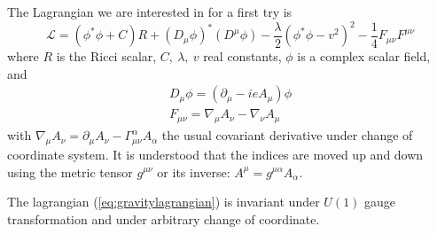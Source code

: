 The Lagrangian we are interested in for a first try is
\begin{equation}
  \mathcal{L} = \left(\phi^*\phi+C\right)R+(D_\mu\phi)^*(D^\mu\phi)-\frac{\lambda}{2}(\phi^*\phi-v^2)^2 -\frac{1}{4}F_{\mu\nu}F^{\mu\nu}\label{eq:gravitylagrangian}
\end{equation}
where $R$ is the Ricci scalar, $C,\ \lambda,\ v$ real constants, $\phi$ is a
complex scalar field, and
\begin{align}
  D_\mu\phi = (\partial_\mu-ieA_\mu)\phi\\
  F_{\mu\nu} = \nabla_\mu A_\nu-\nabla_\nu A_\mu
\end{align}
with $\nabla_\mu A_\nu = \partial_\mu A_{\nu}-\Gamma_{\mu\nu}^\alpha
A_{\alpha}$ the usual covariant derivative under change of coordinate
system. It is understood that the indices are moved up and down using the metric tensor $g^{\mu\nu}$ or its inverse: $A^\mu = g^{\mu\alpha}A_\alpha$.

The lagrangian (\ref{eq:gravitylagrangian}) is invariant under $U(1)$
gauge transformation and under arbitrary change of coordinate.

